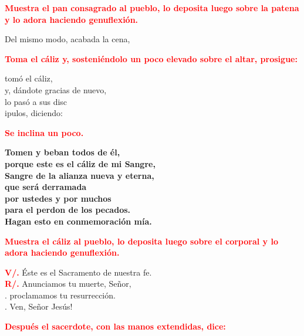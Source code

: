 \documentclass[12pt, letterpaper, spanish]{report}
\begin{document}
\large{\bfseries \textcolor{red}{Muestra el pan consagrado al pueblo, lo deposita luego sobre la patena y lo adora haciendo genuflexi\'on.}}\newline

\Large Del mismo modo, acabada la cena,\newline

\large{\bfseries \textcolor{red}{Toma el c\'aliz y, sosteni\'endolo un poco elevado sobre el altar, prosigue:}}\newline

\Large tom\'o el c\'aliz,\\
y, d\'andote gracias de nuevo,\\
lo pas\'o a sus disc\\ipulos, diciendo:\newline

\large{\bfseries \textcolor{red}{Se inclina un poco.}}\newline

\LARGE{ \bfseries{ Tomen y beban todos de \'el,\\
porque este es el c\'aliz de mi Sangre,\\
Sangre de la alianza nueva y eterna,\\
que ser\'a derramada\\
por ustedes y por muchos\\
para el perdon de los pecados.\\
Hagan esto en conmemoraci\'on m\'ia.}}\newline

\large{\bfseries \textcolor{red}{Muestra el c\'aliz al pueblo, lo deposita luego sobre el corporal y lo adora haciendo genuflexi\'on.}}\newline

\Large \hspace{-0.9cm} {\bfseries \textcolor{red}{V/.}} \hspace{0.5cm} \'Este es el Sacramento de nuestra fe.\\
\Large \hspace{-0.9cm} {\bfseries \textcolor{red}{R/.}} \hspace{0.5cm} Anunciamos tu muerte, Se\~nor,\\
.\hspace{1.5cm} proclamamos tu resurrecci\'on.\\
.\hspace{1.5cm} Ven, Se\~nor Jes\'us!\newline

\large{\bfseries \textcolor{red}{Despu\'es el sacerdote, con las manos extendidas, dice:}}\newline
\end{document}

